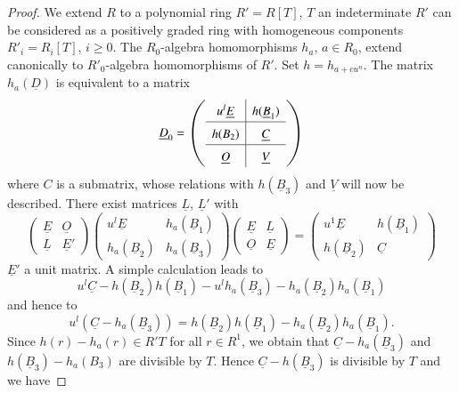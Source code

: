\begin{proof}
We extend $R$ to a polynomial ring $R'=R[T]$, $T$ an indeterminate
$R'$ can be considered as a positively graded ring with homogeneous
components $R'_{i}=R_{i}[T]$, $i\geq 0$. The $R_{0}$-algebra
homomorphisms $h_{a}$, $a\in R_{0}$, extend canonically to
$R'_{0}$-algebra homomorphisms of $R'$. Set $h=h_{a+cu^{n}}$. The
matrix $h_{a}(\underline{D})$ is equivalent to a matrix 
$$
\underline{D}_{0}=
\left(
\renewcommand{\arraystretch}{1.5}
\begin{array}{c|c}
u^{l}\underline{E} & h(\underline{B}_{1})\\
\hline
h(B_{2}) & \underline{C}\\
\hline
\underline{O} & \underline{V}
\end{array}
\right)
$$
where $C$ is a submatrix, whose relations with $h(\underline{B}_{3})$
and $\underline{V}$ will now be described. There exist matrices
$\underline{L}$, $\underline{L}'$ with 
$$
\renewcommand{\arraystretch}{1.2}
\left(
\begin{array}{c|c}
\underline{E} & \underline{O}\\
\hline
\underline{L} & \underline{E}'
\end{array}
\right)
\left(
\begin{array}{c|c}
u^{l}\underline{E} & h_{a}(\underline{B}_{1})\\
\hline
h_{a}(\underline{B}_{2}) & h_{a}(\underline{B}_{3})
\end{array}
\right)
\left(
\begin{array}{c|c}
\underline{E} & \underline{L}\\
\hline
\underline{O} & \underline{E}
\end{array}
\right)=
\left(
\begin{array}{c|c}
u^{1}\underline{E} & h(\underline{B}_{1})\\
\hline
h(\underline{B}_{2}) & \underline{C}
\end{array}
\right)
$$
$\underline{E}'$ a unit matrix. A simple calculation leads to 
$$
u^{l}\underline{C}-h(\underline{B}_{2})h(\underline{B}_{1})-u^{l}h_{a}(\underline{B}_{3})-h_{a}(\underline{B}_{2})h_{a}(\underline{B}_{1}) 
$$
and hence to
$$
u^{l}(\underline{C}-h_{a}(\underline{B}_{3}))=h(\underline{B}_{2})h(\underline{B}_{1})-h_{a}(\underline{B}_{2})h_{a}(\underline{B}_{1}). 
$$
Since $h(r)-h_{a}(r)\in R'T$ for all $r\in R^{1}$, we obtain that
$\underline{C}-h_{a}(\underline{B}_{3})$ and
$h(\underline{B}_{3})-h_{a}(B_{3})$ are divisible by $T$. Hence
$\underline{C}-h(\underline{B}_{3})$ is divisible by $T$ and we have

\end{proof}
